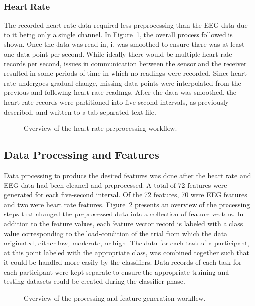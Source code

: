 \documentclass[11pt]{article}
\begin{document}
		\subsubsection{Heart Rate}
		The recorded heart rate data required less preprocessing than the EEG data due to it being only a single channel. In Figure~\ref{fig:heart-preprocessing}, the overall process followed is shown. Once the data was read in, it was smoothed to ensure there was at least one data point per second. While ideally there would be multiple heart rate records per second, issues in communication between the sensor and the receiver resulted in some periods of time in which no readings were recorded.  Since heart rate undergoes gradual change, missing data points were interpolated from the previous and following heart rate readings.  After the data was smoothed, the heart rate records were partitioned into five-second intervals, as previously described, and written to a tab-separated text file.  
		\begin{figure}
		\centering
		\caption{Overview of the heart rate preprocessing workflow.}
		\label{fig:heart-preprocessing}
		\end{figure} 
			
	\subsection{Data Processing and Features}
	Data processing to produce the desired features was done after the heart rate and EEG data had been cleaned and preprocessed. A total of 72 features were generated for each five-second interval. Of the 72 features, 70 were EEG features and two were heart rate features. Figure~\ref{fig:feature_generation} presents an overview of the processing steps that changed the preprocessed data into a collection of feature vectors. In addition to the feature values, each feature vector record is labeled with a class value corresponding to the load-condition of the trial from which the data originated, either low, moderate, or high. The data for each task of a participant, at this point labeled with the appropriate class, was combined together such that it could be handled more easily by the classifiers. Data records of each task for each participant were kept separate to ensure the appropriate training and testing datasets could be created during the classifier phase.
	\begin{figure}
	\centering
	\caption{Overview of the processing and feature generation workflow.}
	\label{fig:feature_generation}
	\end{figure} 
	
\end{document}
